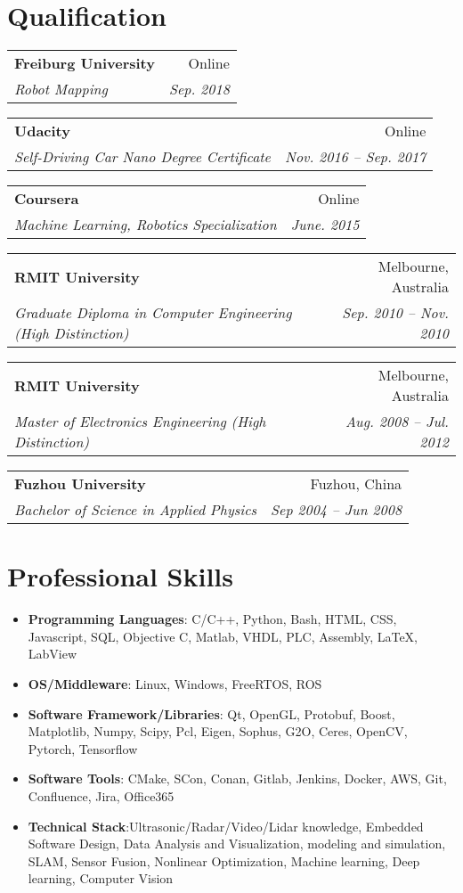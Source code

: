 \documentclass[letterpaper,11pt]{article}
\makeatletter
\newcommand{\resumeItemNoBullet}[4]{
  \vspace{-1pt}
    \begin{tabular*}{0.97\textwidth}{l@{\extracolsep{\fill}}r}
      \textbf{#1} & #2 \\
      \textit{\small#3} & \textit{\small #4} \\
    \end{tabular*}\vspace{-7pt}
}
\newcommand{\resumeSubHeadingListStart}{\begin{itemize}[leftmargin=*]}
\newcommand{\resumeSubHeadingListEnd}{\end{itemize}}
\makeatother
\begin{document}
\section{Qualification}
\resumeItemNoBullet
    {Freiburg University}{Online}
    {Robot Mapping}{Sep. 2018}
\vspace{10pt}
\resumeItemNoBullet
    {Udacity}{Online}
    {Self-Driving Car Nano Degree Certificate}{Nov. 2016 -- Sep. 2017}
\vspace{10pt}
\resumeItemNoBullet
    {Coursera}{Online}
    {Machine Learning, Robotics Specialization}{June. 2015}
\vspace{10pt}
\resumeItemNoBullet
    {RMIT University}{Melbourne, Australia}
    {Graduate Diploma in Computer Engineering (High Distinction)}{Sep. 2010 -- Nov. 2010}
\vspace{10pt}
\resumeItemNoBullet
    {RMIT University}{Melbourne, Australia}
    {Master of Electronics Engineering (High Distinction)}{Aug. 2008 -- Jul. 2012}
\vspace{10pt}
\resumeItemNoBullet
    {Fuzhou University}{Fuzhou, China}
    {Bachelor of Science in Applied Physics}{Sep 2004 -- Jun 2008}

\section{Professional Skills}
  \resumeSubHeadingListStart
    \item{
      \textbf{Programming Languages}{: C/C++, Python, Bash, HTML, CSS, Javascript, SQL, Objective C, Matlab, VHDL, PLC, Assembly, \LaTeX, LabView}
	}
    \item{
      \textbf{OS/Middleware}{: Linux, Windows, FreeRTOS, ROS}
  }

    \item{
      \textbf{Software Framework/Libraries}{: Qt, OpenGL, Protobuf, Boost, Matplotlib, Numpy, Scipy, Pcl, Eigen, Sophus, G2O, Ceres, OpenCV, Pytorch, Tensorflow}
  }
    \item{
      \textbf{Software Tools}{: CMake, SCon, Conan, Gitlab, Jenkins, Docker, AWS, Git, Confluence, Jira, Office365}
  }

  \item{
      \textbf{Technical Stack}{:Ultrasonic/Radar/Video/Lidar knowledge, Embedded Software Design, Data Analysis and Visualization, modeling and simulation, SLAM, Sensor Fusion, Nonlinear Optimization, Machine learning, Deep learning, Computer Vision}
  }

  \resumeSubHeadingListEnd

\end{document}
